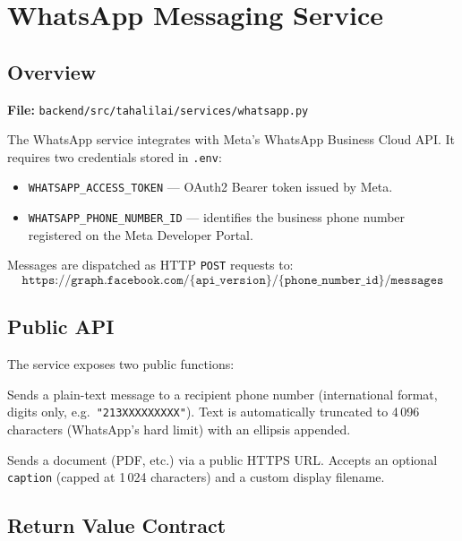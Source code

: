 \documentclass[12pt, a4paper]{article}
\begin{document}
\section{WhatsApp Messaging Service}

\subsection{Overview}

\textbf{File:} \texttt{backend/src/tahalilai/services/whatsapp.py}

The WhatsApp service integrates with Meta's WhatsApp Business Cloud API.
It requires two credentials stored in \texttt{.env}:

\begin{itemize}[leftmargin=1.5em]
  \item \texttt{WHATSAPP\_ACCESS\_TOKEN} — OAuth2 Bearer token issued by Meta.
  \item \texttt{WHATSAPP\_PHONE\_NUMBER\_ID} — identifies the business phone
        number registered on the Meta Developer Portal.
\end{itemize}

Messages are dispatched as HTTP \texttt{POST} requests to:
\[
  \texttt{https://graph.facebook.com/\{api\_version\}/\{phone\_number\_id\}/messages}
\]

\subsection{Public API}

The service exposes two public functions:

\begin{description}[leftmargin=1.5em, style=nextline]
  \item[\texttt{send\_whatsapp\_message(\ldots)}]
    Sends a plain-text message to a recipient phone number
    (international format, digits only, e.g.\ \texttt{"213XXXXXXXXX"}).
    Text is automatically truncated to 4\,096 characters
    (WhatsApp's hard limit) with an ellipsis appended.

  \item[\texttt{send\_whatsapp\_document(\ldots)}]
    Sends a document (PDF, etc.) via a public HTTPS URL.
    Accepts an optional \texttt{caption} (capped at 1\,024 characters)
    and a custom display filename.
\end{description}

\subsection{Return Value Contract}
\end{document}
